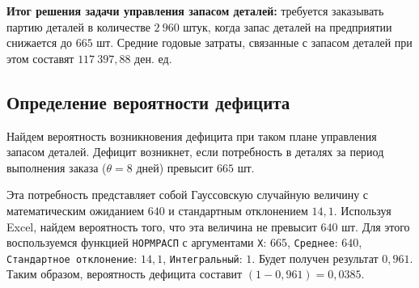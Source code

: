 \textbf{Итог решения задачи управления запасом деталей:}
требуется заказывать партию деталей в количестве $2\:960$ штук, когда
запас деталей на предприятии снижается до $665$ шт. Средние годовые затраты,
связанные с запасом деталей при этом составят $117\:397{,}88$ ден. ед.

\subsection{Определение вероятности дефицита}

Найдем вероятность возникновения дефицита при таком плане управления запасом деталей.
Дефицит возникнет, если потребность в деталях за период выполнения
заказа ($\theta = 8$ дней) превысит $665$ шт.

Эта потребность представляет собой Гауссовскую случайную величину с математическим
ожиданием $640$ и стандартным отклонением $14{,}1$.
Используя Excel, найдем вероятность того, что эта величина не превысит $640$ шт.
Для этого воспользуемся функцией \texttt{НОРМРАСП} с аргументами 
\texttt{X}: $665$, \texttt{Среднее}: $640$, \texttt{Стандартное отклонение}: $14{,}1$,
\texttt{Интегральный}: $1$. Будет получен результат $0{,}961$.
Таким образом, вероятность дефицита составит $(1 - 0{,}961) = 0{,}0385$.

\newpage